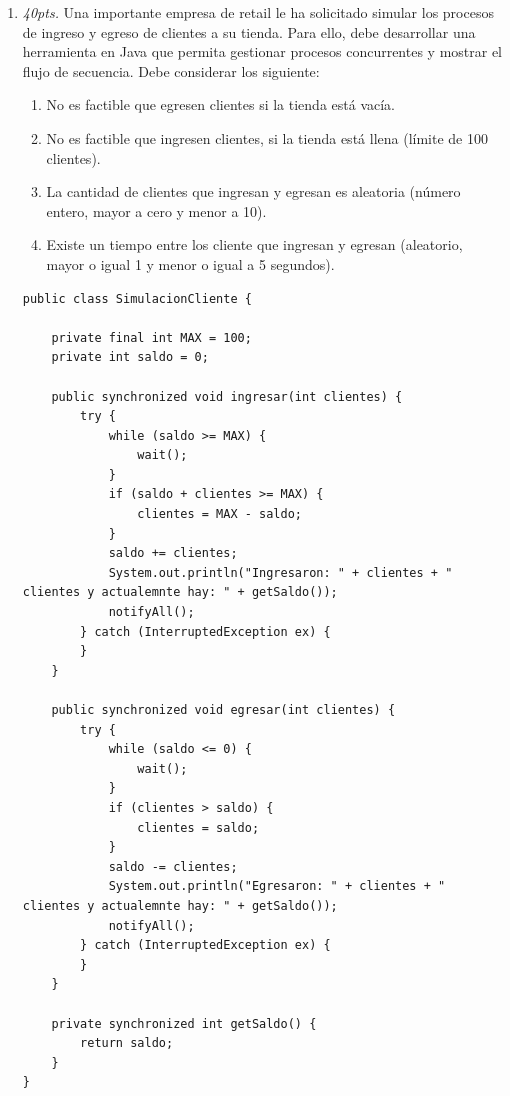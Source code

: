 \documentclass[10pt]{article}
\begin{document}
{\begin{enumerate}
\begin{multicols}{2}
\end{multicols}

\newpage

\item \emph{40pts.} Una importante empresa de retail le ha solicitado simular los procesos de ingreso y egreso de clientes a su tienda. Para ello, debe desarrollar una herramienta en Java que permita gestionar procesos concurrentes y mostrar el flujo de secuencia. Debe considerar los siguiente:

    \begin{enumerate}[label=(\alph*)]
        \item No es factible que egresen clientes si la tienda est\'a vac\'ia.
        \item No es factible que ingresen clientes, si la tienda est\'a llena (l\'imite de 100 clientes). 
        \item La cantidad de clientes que ingresan y egresan es aleatoria (n\'umero entero, mayor a cero y menor a 10).
        \item Existe un tiempo entre los cliente que ingresan y egresan (aleatorio, mayor o igual 1 y menor o igual a 5 segundos).
	\end{enumerate}

\begin{verbatim}
public class SimulacionCliente {

    private final int MAX = 100;
    private int saldo = 0;
    
    public synchronized void ingresar(int clientes) {
        try {
            while (saldo >= MAX) {
                wait();
            }
            if (saldo + clientes >= MAX) {
                clientes = MAX - saldo;
            }
            saldo += clientes;
            System.out.println("Ingresaron: " + clientes + " clientes y actualemnte hay: " + getSaldo());
            notifyAll();
        } catch (InterruptedException ex) {
        }
    }

    public synchronized void egresar(int clientes) {
        try {
            while (saldo <= 0) {
                wait();
            }
            if (clientes > saldo) {
                clientes = saldo;
            }
            saldo -= clientes;
            System.out.println("Egresaron: " + clientes + " clientes y actualemnte hay: " + getSaldo());
            notifyAll();
        } catch (InterruptedException ex) {
        }
    }

    private synchronized int getSaldo() {
        return saldo;
    }
}


\end{verbatim}
\end{enumerate}}
\end{document}
